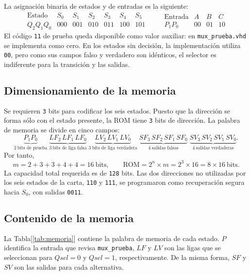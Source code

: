 \documentclass[letterpaper,12pt]{article}
\begin{document}
La asignación binaria de estados y de entradas es la siguiente:
\[
\begin{array}{c|cccccc}
\text{Estado} & S_0 & S_1 & S_2 & S_3 & S_4 & S_5\\ \hline
Q_2Q_1Q_0 & 000 & 001 & 010 & 011 & 100 & 101
\end{array}
\qquad
\begin{array}{c|ccc}
\text{Entrada} & A & B & C\\ \hline
P_1P_0 & 00 & 01 & 10
\end{array}
\]
El código \texttt{11} de prueba queda disponible como valor auxiliar: en \texttt{mux\_prueba.vhd} se implementa como cero. En los estados sin decisión, la implementación utiliza \texttt{00}, pero como sus campos falso y verdadero son idénticos, el selector es indiferente para la transición y las salidas.

\subsection{Dimensionamiento de la memoria}

Se requieren \texttt{3} bits para codificar los seis estados. Puesto que la dirección se forma sólo con el estado presente, la ROM tiene \texttt{3} bits de dirección. La palabra de memoria se divide en cinco campos:
\[
\underbrace{P_1P_0}_{2\ \text{bits de prueba}}\;
\underbrace{LF_2 \, LF_1 \,LF_0}_{3\ \text{bits de liga falsa}}\;
\underbrace{LV_2 \, LV_1 \,LV_0}_{3\ \text{bits de liga verdadera}}\;
\underbrace{SF_3 \, SF_2 \, SF_1 \,SF_0}_{4\ \text{salidas falsas}}\;
\underbrace{SV_3 \, SV_2 \, SV_1 \,SV_0}_{4\ \text{salidas verdaderas}}.
\]
Por tanto,
\[
m=2+3+3+4+4=16\ \text{bits},
\qquad
\text{ROM}=2^n\times m=2^3\times16=8\times16\ \text{bits}.
\]
La capacidad total requerida es de \texttt{128} bits. Las dos direcciones no utilizadas por los seis estados de la carta, \texttt{110} y \texttt{111}, se programaron como recuperación segura hacia $S_0$, con salidas \texttt{0011}.

\subsection{Contenido de la memoria}

La Tabla[\ref{tab:memoria}] contiene la palabra de memoria de cada estado. $P$ identifica la entrada que revisa \texttt{mux\_prueba}, $LF$ y $LV$ son las ligas que se seleccionan para $Qsel=0$ y $Qsel=1$, respectivamente. De la misma forma, $SF$ y $SV$ son las salidas para cada alternativa.
\end{document}
